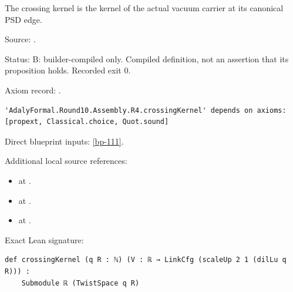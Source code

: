 \begin{definition}[bp-170]
\label{bp-170}
\leanok
The crossing kernel is the kernel of the actual vacuum carrier at its canonical PSD edge.

\par Source: \texttt{}.
\par Status: B: builder-compiled only. Compiled definition, not an assertion that its proposition holds. Recorded exit 0.
\par Axiom record: \texttt{}.
\begin{verbatim}
'AdalyFormal.Round10.Assembly.R4.crossingKernel' depends on axioms: [propext, Classical.choice, Quot.sound]
\end{verbatim}
\par Direct blueprint inputs: \ref{bp-111}.
\par Additional local source references:
\begin{itemize}
\item \texttt{} at \texttt{}.
\item \texttt{} at \texttt{}.
\item \texttt{} at \texttt{}.
\end{itemize}
\par Exact Lean signature:
\begin{verbatim}
def crossingKernel (q R : ℕ) (V : ℝ → LinkCfg (scaleUp 2 1 (dilLu q R))) :
    Submodule ℝ (TwistSpace q R)
\end{verbatim}
\end{definition}

